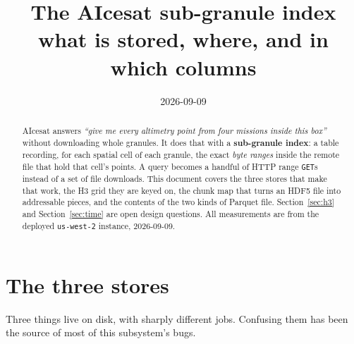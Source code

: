 \documentclass[11pt,a4paper]{article}
\title{\textbf{The AIcesat sub-granule index}\\[2pt]
       \large what is stored, where, and in which columns}
\author{}
\date{2026-09-09}
\newcommand{\code}[1]{\texttt{\small #1}}
\begin{document}
\maketitle
\vspace{-2.2em}

\begin{abstract}
\noindent
AIcesat answers \emph{``give me every altimetry point from four missions inside this box''} without
downloading whole granules. It does that with a \textbf{sub-granule index}: a table recording, for each
spatial cell of each granule, the exact \emph{byte ranges} inside the remote file that hold that cell's
points. A query becomes a handful of HTTP range \code{GET}s instead of a set of file downloads. This document
covers the three stores that make that work, the H3 grid they are keyed on, the chunk map that turns an HDF5
file into addressable pieces, and the contents of the two kinds of Parquet file. Section~\ref{sec:h3} and
Section~\ref{sec:time} are open design questions. All measurements are from the deployed \code{us-west-2}
instance, 2026-09-09.
\end{abstract}

\section{The three stores}

Three things live on disk, with sharply different jobs. Confusing them has been the source of most of this
subsystem's bugs.
\end{document}
